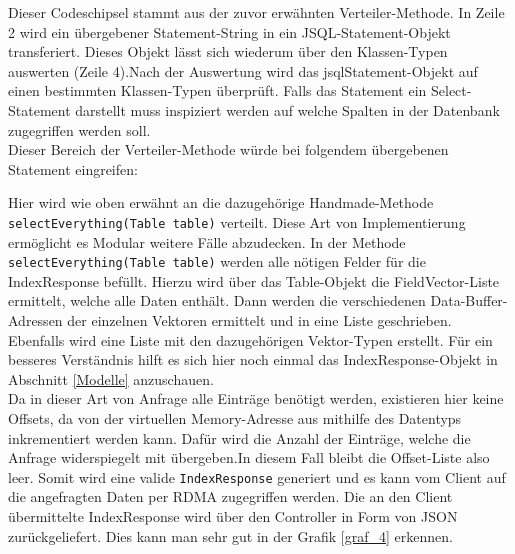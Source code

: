 Dieser Codeschipsel stammt aus der zuvor erwähnten Verteiler-Methode. In Zeile 2  wird ein übergebener Statement-String in ein JSQL-Statement-Objekt transferiert. Dieses Objekt lässt sich wiederum über den Klassen-Typen auswerten (Zeile 4).Nach der Auswertung wird das jsqlStatement-Objekt auf einen bestimmten Klassen-Typen überprüft. Falls das Statement ein Select-Statement darstellt muss inspiziert werden auf welche Spalten in der Datenbank zugegriffen werden soll.\\ 
Dieser Bereich der Verteiler-Methode würde bei folgendem übergebenen Statement eingreifen:

\begin{center}
\end{center}

Hier wird wie oben erwähnt an die dazugehörige Handmade-Methode \texttt{selectEverything(Table table)} verteilt. Diese Art von Implementierung ermöglicht es Modular weitere Fälle abzudecken.
In der Methode \texttt{selectEverything(Table table)} werden alle nötigen Felder für die IndexResponse befüllt. Hierzu wird über das Table-Objekt die FieldVector-Liste ermittelt, welche alle Daten enthält. Dann werden die verschiedenen Data-Buffer-Adressen der einzelnen Vektoren ermittelt und in eine Liste geschrieben. Ebenfalls wird eine Liste mit den dazugehörigen Vektor-Typen erstellt. Für ein besseres Verständnis hilft es sich hier noch einmal das IndexResponse-Objekt in Abschnitt \ref{Modelle} anzuschauen.\\
Da in dieser Art von Anfrage alle Einträge benötigt werden, existieren hier keine Offsets, da von der virtuellen Memory-Adresse aus mithilfe des Datentyps inkrementiert werden kann. Dafür wird die Anzahl der Einträge, welche die Anfrage widerspiegelt mit übergeben.In diesem Fall bleibt die Offset-Liste also leer.
Somit wird eine valide \texttt{IndexResponse} generiert und es kann vom Client auf die angefragten Daten per RDMA zugegriffen werden. Die an den Client übermittelte IndexResponse wird über den Controller in Form von JSON zurückgeliefert. Dies kann man sehr gut in der Grafik \ref{graf_4} erkennen.

